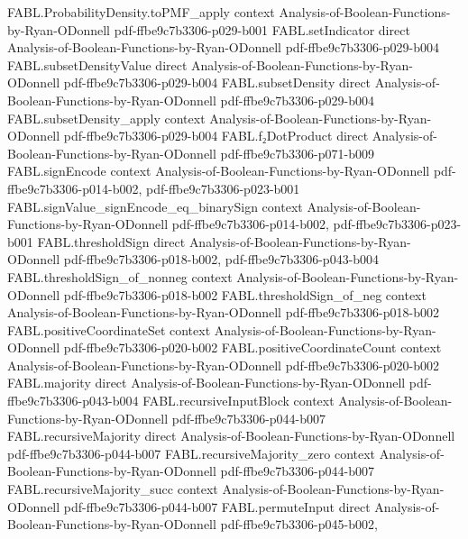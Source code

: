 \begin{theorem}
\proofstep
  {FABL.ProbabilityDensity.toPMF_apply}
  {context}
  {Analysis-of-Boolean-Functions-by-Ryan-ODonnell}
  {pdf-ffbe9c7b3306-p029-b001}
\proofstep
  {FABL.setIndicator}
  {direct}
  {Analysis-of-Boolean-Functions-by-Ryan-ODonnell}
  {pdf-ffbe9c7b3306-p029-b004}
\proofstep
  {FABL.subsetDensityValue}
  {direct}
  {Analysis-of-Boolean-Functions-by-Ryan-ODonnell}
  {pdf-ffbe9c7b3306-p029-b004}
\proofstep
  {FABL.subsetDensity}
  {direct}
  {Analysis-of-Boolean-Functions-by-Ryan-ODonnell}
  {pdf-ffbe9c7b3306-p029-b004}
\proofstep
  {FABL.subsetDensity_apply}
  {context}
  {Analysis-of-Boolean-Functions-by-Ryan-ODonnell}
  {pdf-ffbe9c7b3306-p029-b004}
\proofstep
  {FABL.f₂DotProduct}
  {direct}
  {Analysis-of-Boolean-Functions-by-Ryan-ODonnell}
  {pdf-ffbe9c7b3306-p071-b009}
\proofstep
  {FABL.signEncode}
  {context}
  {Analysis-of-Boolean-Functions-by-Ryan-ODonnell}
  {pdf-ffbe9c7b3306-p014-b002,
    pdf-ffbe9c7b3306-p023-b001}
\proofstep
  {FABL.signValue_signEncode_eq_binarySign}
  {context}
  {Analysis-of-Boolean-Functions-by-Ryan-ODonnell}
  {pdf-ffbe9c7b3306-p014-b002,
    pdf-ffbe9c7b3306-p023-b001}
\proofstep
  {FABL.thresholdSign}
  {direct}
  {Analysis-of-Boolean-Functions-by-Ryan-ODonnell}
  {pdf-ffbe9c7b3306-p018-b002,
    pdf-ffbe9c7b3306-p043-b004}
\proofstep
  {FABL.thresholdSign_of_nonneg}
  {context}
  {Analysis-of-Boolean-Functions-by-Ryan-ODonnell}
  {pdf-ffbe9c7b3306-p018-b002}
\proofstep
  {FABL.thresholdSign_of_neg}
  {context}
  {Analysis-of-Boolean-Functions-by-Ryan-ODonnell}
  {pdf-ffbe9c7b3306-p018-b002}
\proofstep
  {FABL.positiveCoordinateSet}
  {context}
  {Analysis-of-Boolean-Functions-by-Ryan-ODonnell}
  {pdf-ffbe9c7b3306-p020-b002}
\proofstep
  {FABL.positiveCoordinateCount}
  {context}
  {Analysis-of-Boolean-Functions-by-Ryan-ODonnell}
  {pdf-ffbe9c7b3306-p020-b002}
\proofstep
  {FABL.majority}
  {direct}
  {Analysis-of-Boolean-Functions-by-Ryan-ODonnell}
  {pdf-ffbe9c7b3306-p043-b004}
\proofstep
  {FABL.recursiveInputBlock}
  {context}
  {Analysis-of-Boolean-Functions-by-Ryan-ODonnell}
  {pdf-ffbe9c7b3306-p044-b007}
\proofstep
  {FABL.recursiveMajority}
  {direct}
  {Analysis-of-Boolean-Functions-by-Ryan-ODonnell}
  {pdf-ffbe9c7b3306-p044-b007}
\proofstep
  {FABL.recursiveMajority_zero}
  {context}
  {Analysis-of-Boolean-Functions-by-Ryan-ODonnell}
  {pdf-ffbe9c7b3306-p044-b007}
\proofstep
  {FABL.recursiveMajority_succ}
  {context}
  {Analysis-of-Boolean-Functions-by-Ryan-ODonnell}
  {pdf-ffbe9c7b3306-p044-b007}
\proofstep
  {FABL.permuteInput}
  {direct}
  {Analysis-of-Boolean-Functions-by-Ryan-ODonnell}
  {pdf-ffbe9c7b3306-p045-b002,
}
\end{theorem}
